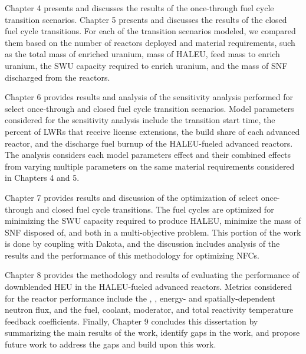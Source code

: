 Chapter 4 presents and discusses the results of the 
once-through fuel cycle transition scenarios. Chapter 5 presents 
and discusses the 
results of the closed fuel cycle transitions. For each of the transition 
scenarios modeled, we compared them based on the number of reactors 
deployed and material requirements, such as the total mass of enriched 
uranium, mass of \gls{HALEU}, 
feed mass to enrich uranium, the \gls{SWU} capacity required to enrich 
uranium, and the mass of \gls{SNF} discharged from the reactors. 

Chapter 6 provides results 
and analysis of the sensitivity analysis performed for select once-through 
and closed fuel cycle transition scenarios. Model parameters considered 
for the sensitivity analysis include the transition start time, 
the percent of \glspl{LWR} that receive license extensions, the build share 
of each advanced reactor, and the discharge fuel burnup of the 
\gls{HALEU}-fueled advanced reactors. The analysis considers each model 
parameters effect and their combined effects from varying multiple 
parameters on the same material requirements considered in Chapters 4 and 5.

Chapter 7 provides 
results and discussion of the optimization of select once-through and 
closed fuel cycle transitions. The fuel cycles are optimized for minimizing 
the \gls{SWU} capacity required to produce \gls{HALEU}, minimize the 
mass of \gls{SNF} disposed of, and both in a multi-objective problem. This 
portion of the work is done by coupling \Cyclus with Dakota, 
and the discussion includes analysis of the results 
and the performance of this methodology for optimizing \glspl{NFC}. 

Chapter 8 provides the methodology and 
results of evaluating the performance of downblended \gls{HEU} in 
the \gls{HALEU}-fueled advanced reactors. Metrics considered for the 
reactor performance include the \keff, \betaEff, energy- and 
spatially-dependent neutron flux, and the fuel, coolant, moderator, and
total reactivity temperature feedback coefficients. 
Finally, Chapter 9 concludes this dissertation by summarizing 
the main results of the work, identify gaps in the work, and 
propose future work to address the gaps and 
build upon this work. 